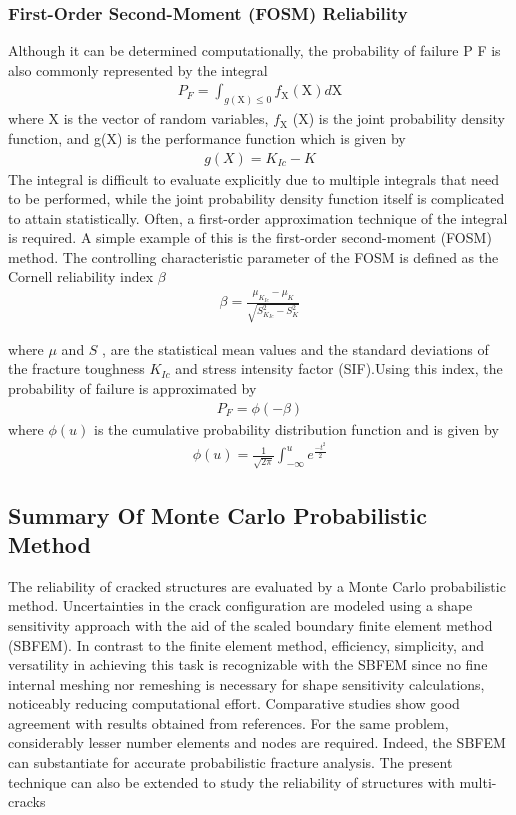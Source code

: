 \documentclass[12pt]{article}
\begin{document}
\subsubsection{First-Order Second-Moment (FOSM) Reliability}
Although it can be determined computationally, the probability of failure P F is also commonly represented by the integral
\begin{align*}
    P_F = \int_{g(\text{X}) \le 0} f_{\text{X}}(\text{X})d\text{X} \tag{31}
\end{align*}
where X is the vector of random variables, $f_\text{X}$ (X) is the joint probability density function, and g(X) is the performance function
which is given by
\begin{align*}
    g(X) = K_{Ic} - K
\end{align*}
The integral is difficult to evaluate explicitly due to multiple integrals that need to be performed, while the joint
probability density function itself is complicated to attain statistically. Often, a first-order approximation technique of the
integral is required. A simple example of this is the first-order second-moment (FOSM) method. The controlling 
characteristic parameter of the FOSM is defined as the Cornell reliability index $\beta$
\begin{align*}
    \beta = \frac{\mu_{K_{Ic}}-\mu_K}{\sqrt{S_{K_{Ic}}^2 - S_K^2}} \tag{32}
\end{align*}

where $\mu$ and $S$ , are the statistical mean values and the standard deviations of the fracture toughness $K_{Ic}$ and
stress intensity factor (SIF).Using this index, the probability of failure is approximated by
\begin{align*}
    P_F = \phi(-\beta) \tag{33}
\end{align*}
where $\phi(u)$ is the cumulative probability distribution function and is given by
\begin{align*}
    \phi(u) = \frac{1}{\sqrt{2 \pi}}\int_{-\infty}^{u} e^{\frac{-t^2}{2}}  \tag{34}
\end{align*}
\subsection{Summary Of Monte Carlo Probabilistic Method}
The reliability of cracked structures are evaluated by a Monte Carlo probabilistic method. Uncertainties in the crack configuration 
are modeled using a shape sensitivity approach with the aid of the scaled boundary finite element method
(SBFEM). In contrast to the finite element method, efficiency, simplicity, and versatility in achieving this task is recognizable
with the SBFEM since no fine internal meshing nor remeshing is necessary for shape sensitivity calculations, noticeably
reducing computational effort. Comparative studies show good agreement with results obtained from references. For the
same problem, considerably lesser number elements and nodes are required. Indeed, the SBFEM can substantiate for 
accurate probabilistic fracture analysis. The present technique can also be extended to study the reliability of structures with
multi-cracks
\end{document}
